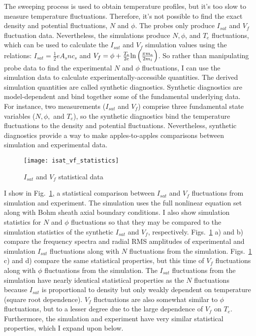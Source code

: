 The sweeping process is used to obtain temperature profiles, but it's too slow to measure temperature fluctuations. Therefore, it's not 
possible to find the exact density and potential fluctuations, $N$ and $\phi$. The probes only produce $I_{sat}$ and $V_f$ fluctuation data.
Nevertheless, the simulations produce $N, \phi$, and $T_e$
fluctuations, which can be used to calculate the $I_{sat}$ and $V_f$ simulation values using the relations: $I_{sat} = \frac{1}{2} e A_s n c_s$ and
$V_f = \phi + \frac{T_e}{2 e} {\rm ln} \left(\frac{\pi m_e}{2 m_i}\right)$. So rather than manipulating probe data to find the experimental $N$ and $\phi$ fluctuations, I can
use the simulation data to calculate experimentally-accessible quantities. The derived simulation quantities are called synthetic diagnostics. 
Synthetic diagnostics are model-dependent and bind together some of the fundamental underlying data. 
For instance, two measurements ($I_{sat}$ and $V_f$) comprise three fundamental state variables ($N, \phi,$ and $T_e$), so the synthetic diagnostics bind the temperature fluctuations
to the density and potential fluctuations. Nevertheless, synthetic diagnostics provide a way to make
apples-to-apples comparisons between simulation and experimental data.


\begin{figure}
\centerline{\texttt{[image: isat\_vf\_statistics]}}
\caption{$I_{sat}$ and $V_f$ statistical data}
\label{isat_vf_statistics}
\end{figure}

I show in Fig.~\ref{isat_vf_statistics}, a statistical comparison between $I_{sat}$ and $V_f$ fluctuations from simulation and experiment. The simulation uses the full nonlinear equation
set along with Bohm sheath axial boundary conditions. I also show simulation statistics for $N$ and $\phi$ fluctuations so that they may be compared to the simulation statistics of the synthetic
$I_{sat}$ and $V_f$, respectively. Figs.~\ref{isat_vf_statistics} a) and b) compare the frequency spectra and radial RMS amplitudes of experimental and simulation $I_{sat}$ 
fluctuations along with $N$ fluctuations from the simulation. Figs.~\ref{isat_vf_statistics} c) and d) compare the same statistical properties, but this time of $V_f$ 
fluctuations along with $\phi$ fluctuations from the simulation. The $I_{sat}$ fluctuations from the simulation have nearly identical statistical properties as the $N$ fluctuations
because $I_{sat}$ is proportional to density but only weakly dependent on temperature (square root dependence). $V_f$ fluctuations are also somewhat similar to $\phi$ fluctuations,
but to a lesser degree due to the large dependence of $V_f$ on $T_e$. Furthermore, the simulation and experiment have very similar statistical properties, which I expand upon below.

